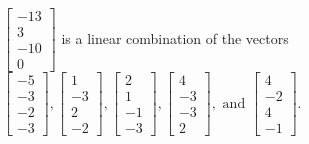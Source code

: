 \begin{exercise}
\begin{exerciseStatement}
  \end{exerciseStatement}
  \begin{exerciseAnswer}
   \(\left[\begin{array}{c}
-13 \\
3 \\
-10 \\
0
\end{array}\right]\) 
  	 is  
	a linear combination of the vectors \(\left[\begin{array}{c}
-5 \\
-3 \\
-2 \\
-3
\end{array}\right] , \left[\begin{array}{c}
1 \\
-3 \\
2 \\
-2
\end{array}\right] , \left[\begin{array}{c}
2 \\
1 \\
-1 \\
-3
\end{array}\right] , \left[\begin{array}{c}
4 \\
-3 \\
-3 \\
2
\end{array}\right] , \text{ and } \left[\begin{array}{c}
4 \\
-2 \\
4 \\
-1
\end{array}\right]\).

	
  


  \end{exerciseAnswer}
\end{exercise}